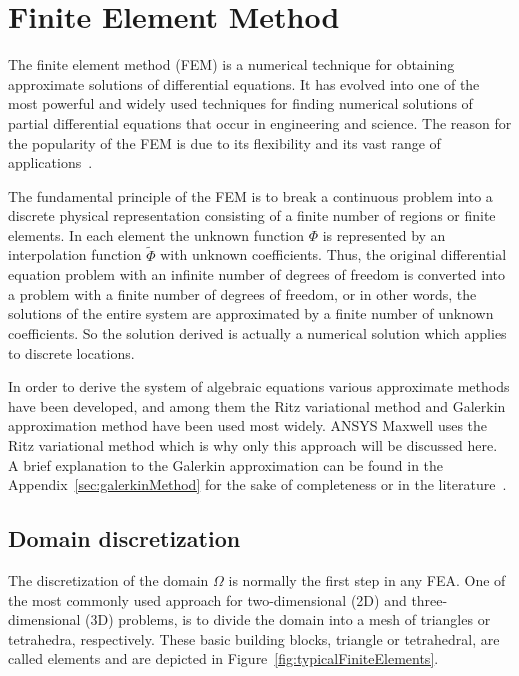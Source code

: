 \section{Finite Element Method}\label{sec:finiteElementMethod}
The finite element method (FEM) is a numerical technique for obtaining approximate solutions of differential equations. It has evolved into one of the most powerful and widely used techniques for finding numerical solutions of partial differential equations that occur in engineering and science. The reason for the popularity of the FEM is due to its flexibility and its vast range of applications~\cite{Zienkiewicz1971,Strang1988,Rao2005}. 

The fundamental principle of the FEM is to break a continuous problem into a discrete physical representation consisting of a finite number of regions or finite elements. In each element the unknown function $\Phi$ is represented by an interpolation function $\tilde{\Phi}$ with unknown coefficients. Thus, the original differential equation problem with an infinite number of degrees of freedom is converted into a problem with a finite number of degrees of freedom, or in other words, the solutions of the entire system are approximated by a finite number of unknown coefficients. So the solution derived is actually a numerical solution which applies to discrete locations.

In order to derive the system of algebraic equations various approximate methods have been developed, and among them the Ritz variational method and Galerkin approximation method have been used most widely. ANSYS Maxwell uses the Ritz variational method which is why only this approach will be discussed here. A brief explanation to the Galerkin approximation can be found in the Appendix~\ref{sec:galerkinMethod} for the sake of completeness or in the literature~\cite{Jin2014}. 

\subsection{Domain discretization}
\label{subsec:domainDiscretization}
The discretization of the domain $\Omega$ is normally the first step in any FEA. One of the most commonly used approach for two-dimensional (2D) and three-dimensional (3D) problems, is to divide the domain into a mesh of triangles or tetrahedra, respectively. These basic building blocks, triangle or tetrahedral, are called elements and are depicted in Figure~\ref{fig:typicalFiniteElements}.

